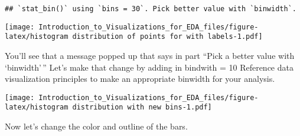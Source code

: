 \documentclass[]{article}
\newenvironment{Shaded}{\begin{snugshade}}{\end{snugshade}}
\newcommand{\DataTypeTok}[1]{\textcolor[rgb]{0.13,0.29,0.53}{#1}}
\newcommand{\DecValTok}[1]{\textcolor[rgb]{0.00,0.00,0.81}{#1}}
\newcommand{\KeywordTok}[1]{\textcolor[rgb]{0.13,0.29,0.53}{\textbf{#1}}}
\newcommand{\NormalTok}[1]{#1}
\newcommand{\OperatorTok}[1]{\textcolor[rgb]{0.81,0.36,0.00}{\textbf{#1}}}
\newcommand{\StringTok}[1]{\textcolor[rgb]{0.31,0.60,0.02}{#1}}
\begin{document}
\begin{verbatim}
## `stat_bin()` using `bins = 30`. Pick better value with `binwidth`.
\end{verbatim}

\texttt{[image: Introduction\_to\_Visualizations\_for\_EDA\_files/figure-latex/histogram distribution of points for with labels-1.pdf]}

You'll see that a message popped up that says in part ``Pick a better
value with `binwidth'\,'' Let's make that change by adding in bindwith =
10 Reference data visualization principles to make an appropriate
binwidth for your analysis.

\begin{Shaded}
\end{Shaded}

\texttt{[image: Introduction\_to\_Visualizations\_for\_EDA\_files/figure-latex/histogram distribution with new bins-1.pdf]}

Now let's change the color and outline of the bars.

\begin{Shaded}
\end{Shaded}
\end{document}
